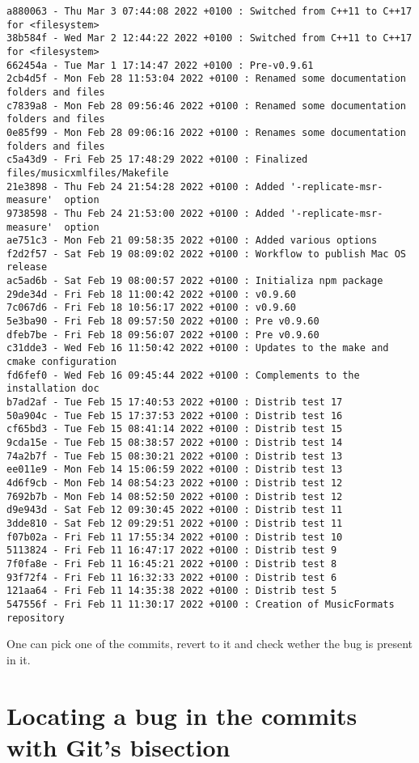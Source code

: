 \begin{lstlisting}[language=Terminal]
a880063 - Thu Mar 3 07:44:08 2022 +0100 : Switched from C++11 to C++17 for <filesystem>
38b584f - Wed Mar 2 12:44:22 2022 +0100 : Switched from C++11 to C++17 for <filesystem>
662454a - Tue Mar 1 17:14:47 2022 +0100 : Pre-v0.9.61
2cb4d5f - Mon Feb 28 11:53:04 2022 +0100 : Renamed some documentation folders and files
c7839a8 - Mon Feb 28 09:56:46 2022 +0100 : Renamed some documentation folders and files
0e85f99 - Mon Feb 28 09:06:16 2022 +0100 : Renames some documentation folders and files
c5a43d9 - Fri Feb 25 17:48:29 2022 +0100 : Finalized files/musicxmlfiles/Makefile
21e3898 - Thu Feb 24 21:54:28 2022 +0100 : Added '-replicate-msr-measure'  option
9738598 - Thu Feb 24 21:53:00 2022 +0100 : Added '-replicate-msr-measure'  option
ae751c3 - Mon Feb 21 09:58:35 2022 +0100 : Added various options
f2d2f57 - Sat Feb 19 08:09:02 2022 +0100 : Workflow to publish Mac OS release
ac5ad6b - Sat Feb 19 08:00:57 2022 +0100 : Initializa npm package
29de34d - Fri Feb 18 11:00:42 2022 +0100 : v0.9.60
7c067d6 - Fri Feb 18 10:56:17 2022 +0100 : v0.9.60
5e3ba90 - Fri Feb 18 09:57:50 2022 +0100 : Pre v0.9.60
dfeb7be - Fri Feb 18 09:56:07 2022 +0100 : Pre v0.9.60
c31dde3 - Wed Feb 16 11:50:42 2022 +0100 : Updates to the make and cmake configuration
fd6fef0 - Wed Feb 16 09:45:44 2022 +0100 : Complements to the installation doc
b7ad2af - Tue Feb 15 17:40:53 2022 +0100 : Distrib test 17
50a904c - Tue Feb 15 17:37:53 2022 +0100 : Distrib test 16
cf65bd3 - Tue Feb 15 08:41:14 2022 +0100 : Distrib test 15
9cda15e - Tue Feb 15 08:38:57 2022 +0100 : Distrib test 14
74a2b7f - Tue Feb 15 08:30:21 2022 +0100 : Distrib test 13
ee011e9 - Mon Feb 14 15:06:59 2022 +0100 : Distrib test 13
4d6f9cb - Mon Feb 14 08:54:23 2022 +0100 : Distrib test 12
7692b7b - Mon Feb 14 08:52:50 2022 +0100 : Distrib test 12
d9e943d - Sat Feb 12 09:30:45 2022 +0100 : Distrib test 11
3dde810 - Sat Feb 12 09:29:51 2022 +0100 : Distrib test 11
f07b02a - Fri Feb 11 17:55:34 2022 +0100 : Distrib test 10
5113824 - Fri Feb 11 16:47:17 2022 +0100 : Distrib test 9
7f0fa8e - Fri Feb 11 16:45:21 2022 +0100 : Distrib test 8
93f72f4 - Fri Feb 11 16:32:33 2022 +0100 : Distrib test 6
121aa64 - Fri Feb 11 14:35:38 2022 +0100 : Distrib test 5
547556f - Fri Feb 11 11:30:17 2022 +0100 : Creation of MusicFormats repository
\end{lstlisting}

One can pick one of the commits, revert to it and check wether the bug is present in it.


\section{Locating a bug in the commits with Git's bisection}


